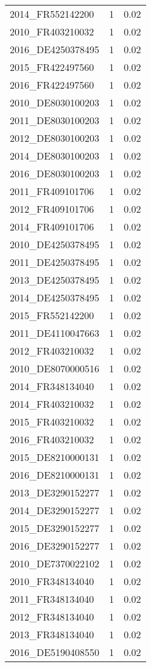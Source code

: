 \begin{table*}[htbp]
\begin{tabular}{lrr}
2014_FR552142200 & 1 & 0.02 \\
2010_FR403210032 & 1 & 0.02 \\
2016_DE4250378495 & 1 & 0.02 \\
2015_FR422497560 & 1 & 0.02 \\
2016_FR422497560 & 1 & 0.02 \\
2010_DE8030100203 & 1 & 0.02 \\
2011_DE8030100203 & 1 & 0.02 \\
2012_DE8030100203 & 1 & 0.02 \\
2014_DE8030100203 & 1 & 0.02 \\
2016_DE8030100203 & 1 & 0.02 \\
2011_FR409101706 & 1 & 0.02 \\
2012_FR409101706 & 1 & 0.02 \\
2014_FR409101706 & 1 & 0.02 \\
2010_DE4250378495 & 1 & 0.02 \\
2011_DE4250378495 & 1 & 0.02 \\
2013_DE4250378495 & 1 & 0.02 \\
2014_DE4250378495 & 1 & 0.02 \\
2015_FR552142200 & 1 & 0.02 \\
2011_DE4110047663 & 1 & 0.02 \\
2012_FR403210032 & 1 & 0.02 \\
2010_DE8070000516 & 1 & 0.02 \\
2014_FR348134040 & 1 & 0.02 \\
2014_FR403210032 & 1 & 0.02 \\
2015_FR403210032 & 1 & 0.02 \\
2016_FR403210032 & 1 & 0.02 \\
2015_DE8210000131 & 1 & 0.02 \\
2016_DE8210000131 & 1 & 0.02 \\
2013_DE3290152277 & 1 & 0.02 \\
2014_DE3290152277 & 1 & 0.02 \\
2015_DE3290152277 & 1 & 0.02 \\
2016_DE3290152277 & 1 & 0.02 \\
2010_DE7370022102 & 1 & 0.02 \\
2010_FR348134040 & 1 & 0.02 \\
2011_FR348134040 & 1 & 0.02 \\
2012_FR348134040 & 1 & 0.02 \\
2013_FR348134040 & 1 & 0.02 \\
2016_DE5190408550 & 1 & 0.02 \\

\end{tabular}
\end{table*}

